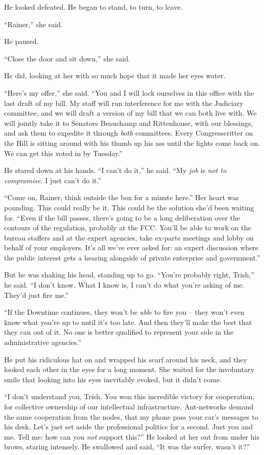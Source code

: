 He looked defeated. He began to stand, to turn, to leave.

“Rainer,” she said.

He paused.

“Close the door and sit down,” she said.

He did, looking at her with so much hope that it made her eyes water.

“Here's my offer,” she said. “You and I will lock ourselves in 
this office with the last draft of my bill. My staff will run 
interference for me with the Judiciary committee, and we will draft a 
version of my bill that we can both live with. We will jointly take it 
to Senators Beauchamp and Rittenhouse, with our blessings, and ask them 
to expedite it through \emph{both} committees. Every Congresscritter on 
the Hill is sitting around with his thumb up his ass until the lights 
come back on. We can get this voted in by Tuesday.”

He stared down at his hands. “I can't do it,” he said. “My 
\emph{job} is \emph{not to compromise}. I just can't do it.”

“Come on, Rainer, think outside the box for a minute here.” Her 
heart was pounding. This could really be it. This could be the solution 
she'd been waiting for. “Even if the bill passes, there's going to be 
a long deliberation over the contours of the regulation, probably at 
the FCC. You'll be able to work on the bureau staffers and at the 
expert agencies, take ex-parte meetings and lobby on behalf of your 
employers. It's all we've ever asked for: an expert discussion where 
the public interest gets a hearing alongside of private enterprise and 
government.”

But he was shaking his head, standing up to go. “You're probably 
right, Trish,” he said. “I don't know. What I know is, I can't do 
what you're asking of me. They'd just fire me.”

“If the Downtime continues, they won't be \emph{able} to fire you -- 
they won't even know what you're up to until it's too late. And then 
they'll make the best that they can out of it. No one is better 
qualified to represent your side in the administrative agencies.”

He put his ridiculous hat on and wrapped his scarf around his neck, and 
they looked each other in the eyes for a long moment. She waited for 
the involuntary smile that looking into his eyes inevitably evoked, but 
it didn't come.

“I don't understand you, Trish. You won this incredible victory for 
cooperation, for collective ownership of our intellectual 
infrastructure. Ant-networks demand the same cooperation from the 
nodes, that my phone pass your car's messages to his desk. Let's just 
set aside the professional politics for a second. Just you and me. Tell 
me: how can you \emph{not} support this?” He looked at her out from 
under his brows, staring intensely. He swallowed and said, “It was 
the surfer, wasn't it?”

